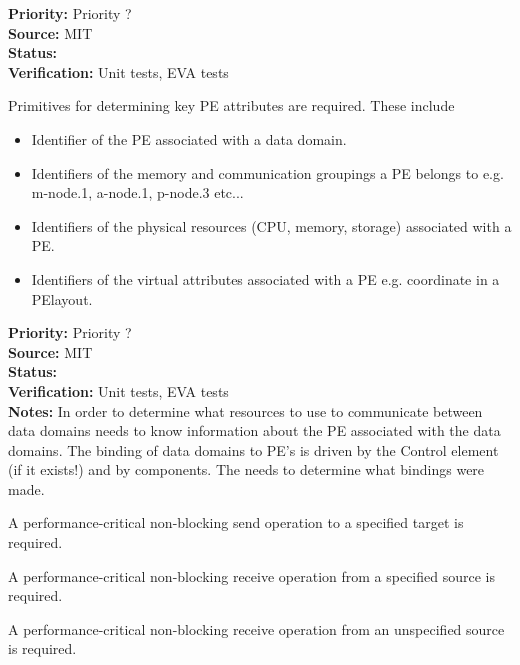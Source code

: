 \begin{reqlist}
{\bf Priority:} Priority ? \\
{\bf Source:}  MIT \\
{\bf Status:}  \\
{\bf Verification:} Unit tests, EVA tests \\
\end{reqlist}


Primitives for determining key PE attributes are required.
These include
\begin{itemize}
\item Identifier of the PE associated with a data domain.
\item Identifiers of the memory and communication groupings a PE
belongs to e.g. m-node.1, a-node.1, p-node.3 etc...
\item Identifiers of the physical resources (CPU, memory, storage) associated with a PE.
\item Identifiers of the virtual attributes associated with a PE e.g. coordinate in a PElayout.
\end{itemize}

\begin{reqlist}
{\bf Priority:} Priority ? \\
{\bf Source:}  MIT \\
{\bf Status:}  \\
{\bf Verification:} Unit tests, EVA tests \\
{\bf Notes:}
In order to determine what resources to use to communicate between data domains 
{\bf \shortname} needs to know information about the PE associated with the
data domains. The binding of data domains to PE's is driven by the Control element
(if it exists!) and by components. The {\bf \shortname} needs to determine what
bindings were made.
\end{reqlist}



A performance-critical non-blocking send operation to a specified
target is required.

A performance-critical non-blocking receive operation from a specified
source is required.

A performance-critical non-blocking receive operation from an unspecified
source is required.


